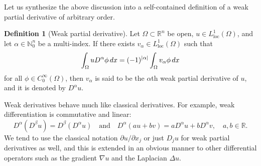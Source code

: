 \documentclass[english, 12pt, a4paper, sci, utf8, a-2b, online]{aaltothesis}
\theoremstyle{definition}
\newtheorem{definition}{Definition}[section]
\theoremstyle{plain}
\DeclarePairedDelimiter\abs{\lvert}{\rvert}
\newcommand*\diff{\mathop{}\!d}
\numberwithin{equation}{section}
\begin{document}
Let us synthesize the above discussion into a self-contained definition
of a weak partial derivative of arbitrary order.
\begin{definition}[Weak partial derivative]
    \label{def:weakderivative}
    Let $\Omega \subset \mathbb{R}^n$ be open,
    $u \in L_{\text{loc}}^1(\Omega)$, and let 
    $\alpha \in \mathbb{N}_0^n$ be a multi-index. If there exists
    $v_{\alpha} \in L_{\text{loc}}^1(\Omega)$ such that
    \begin{equation*}
        \int_{\Omega} u D^{\alpha} \phi \diff x
        = (-1)^{\abs{\alpha}} \int_{\Omega} v_{\alpha} \phi \diff x
    \end{equation*}
    for all $\phi \in C_0^{\infty}(\Omega)$, then
    $v_{\alpha}$ is said to be the $\alpha$th weak partial derivative of $u$,
    and it is denoted by $D^{\alpha} u$.
\end{definition}
Weak derivatives behave much like classical derivatives.
For example, weak differentiation is commutative and linear:
\begin{equation*}
    D^{\alpha}(D^{\beta} u) = D^{\beta}(D^{\alpha} u)
    \quad \text{and} \quad
    D^{\alpha}(a u + b v) = a D^{\alpha}u + b D^{\alpha}v,
    \quad a,b \in \mathbb{R}.
\end{equation*}
We tend to use the classical notation $\partial u / \partial x_j$
or just $D_j u$ for weak partial derivatives as well,
and this is extended in an obvious manner to other
differential operators such as the gradient $\nabla u$ and the Laplacian $\Delta u$.
\end{document}
